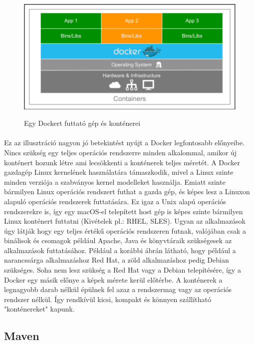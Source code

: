 \begin{figure}[h]
	\centering
	\includegraphics[width=1\linewidth]{figures/docker-work}
	\caption{Egy Dockert futtató gép és konténerei}
	\label{fig:docker-work}
	\cite{gallagher2015mastering}
\end{figure}

\paragraph{}
Ez az illusztráció nagyon jó betekintést nyújt a Docker legfontosabb előnyeibe.
Nincs szükség egy teljes operációs rendszerre minden alkalommal, amikor új konténert hozunk létre ami lecsökkenti a konténerek teljes méretét.
A Docker gazdagép Linux kernelének használatára támaszkodik, mivel a Linux szinte minden verziója a szabványos kernel modelleket használja.
Emiatt szinte bármilyen Linux operációs rendszert futhat a gazda gép, és képes lesz a Linuxon alapuló operációs rendszerek futtatására. 
Ez igaz a Unix alapú operációs rendszerekre is, így egy macOS-el telepített host gép is képes szinte bármilyen Linux konténert futtatni (Kivételek pl.: RHEL, SLES). 
Ugyan az alkalmazások úgy látják hogy egy teljes értékű operációs rendszeren futnak, valójában csak a binálisok és csomagok például Apache, Java és könyvtáraik szükségesek az alkalmazások futtatásához.
Például a korábbi ábrán látható, hogy például a narancssárga alkalmazáshoz Red Hat, a zöld alkalmazáshoz pedig Debian szükséges.
Soha nem lesz szükség a Red Hat vagy a Debian telepítésére, így a Docker egy másik előnye a képek mérete kerül előtérbe.
A konténerek a legnagyobb darab nélkül épülnek fel azaz a rendszermag vagy az operációs rendszer nélkül.
Így rendkívül kicsi, kompakt és könnyen szállítható "konténereket" kapunk.


\pagebreak
\subsection{Maven}
